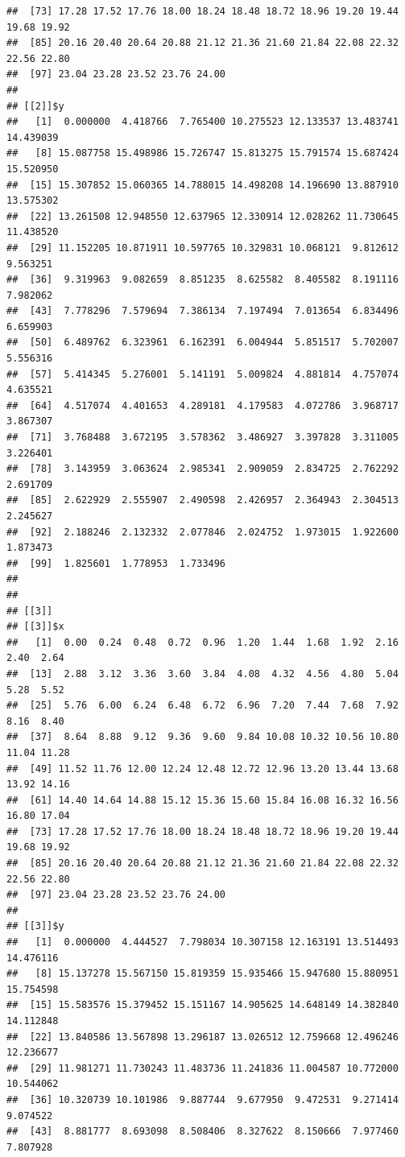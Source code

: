 \documentclass[
  ignorenonframetext,
]{beamer}
\begin{document}
\begin{frame}[fragile]{}
\begin{verbatim}
##  [73] 17.28 17.52 17.76 18.00 18.24 18.48 18.72 18.96 19.20 19.44 19.68 19.92
##  [85] 20.16 20.40 20.64 20.88 21.12 21.36 21.60 21.84 22.08 22.32 22.56 22.80
##  [97] 23.04 23.28 23.52 23.76 24.00
## 
## [[2]]$y
##   [1]  0.000000  4.418766  7.765400 10.275523 12.133537 13.483741 14.439039
##   [8] 15.087758 15.498986 15.726747 15.813275 15.791574 15.687424 15.520950
##  [15] 15.307852 15.060365 14.788015 14.498208 14.196690 13.887910 13.575302
##  [22] 13.261508 12.948550 12.637965 12.330914 12.028262 11.730645 11.438520
##  [29] 11.152205 10.871911 10.597765 10.329831 10.068121  9.812612  9.563251
##  [36]  9.319963  9.082659  8.851235  8.625582  8.405582  8.191116  7.982062
##  [43]  7.778296  7.579694  7.386134  7.197494  7.013654  6.834496  6.659903
##  [50]  6.489762  6.323961  6.162391  6.004944  5.851517  5.702007  5.556316
##  [57]  5.414345  5.276001  5.141191  5.009824  4.881814  4.757074  4.635521
##  [64]  4.517074  4.401653  4.289181  4.179583  4.072786  3.968717  3.867307
##  [71]  3.768488  3.672195  3.578362  3.486927  3.397828  3.311005  3.226401
##  [78]  3.143959  3.063624  2.985341  2.909059  2.834725  2.762292  2.691709
##  [85]  2.622929  2.555907  2.490598  2.426957  2.364943  2.304513  2.245627
##  [92]  2.188246  2.132332  2.077846  2.024752  1.973015  1.922600  1.873473
##  [99]  1.825601  1.778953  1.733496
## 
## 
## [[3]]
## [[3]]$x
##   [1]  0.00  0.24  0.48  0.72  0.96  1.20  1.44  1.68  1.92  2.16  2.40  2.64
##  [13]  2.88  3.12  3.36  3.60  3.84  4.08  4.32  4.56  4.80  5.04  5.28  5.52
##  [25]  5.76  6.00  6.24  6.48  6.72  6.96  7.20  7.44  7.68  7.92  8.16  8.40
##  [37]  8.64  8.88  9.12  9.36  9.60  9.84 10.08 10.32 10.56 10.80 11.04 11.28
##  [49] 11.52 11.76 12.00 12.24 12.48 12.72 12.96 13.20 13.44 13.68 13.92 14.16
##  [61] 14.40 14.64 14.88 15.12 15.36 15.60 15.84 16.08 16.32 16.56 16.80 17.04
##  [73] 17.28 17.52 17.76 18.00 18.24 18.48 18.72 18.96 19.20 19.44 19.68 19.92
##  [85] 20.16 20.40 20.64 20.88 21.12 21.36 21.60 21.84 22.08 22.32 22.56 22.80
##  [97] 23.04 23.28 23.52 23.76 24.00
## 
## [[3]]$y
##   [1]  0.000000  4.444527  7.798034 10.307158 12.163191 13.514493 14.476116
##   [8] 15.137278 15.567150 15.819359 15.935466 15.947680 15.880951 15.754598
##  [15] 15.583576 15.379452 15.151167 14.905625 14.648149 14.382840 14.112848
##  [22] 13.840586 13.567898 13.296187 13.026512 12.759668 12.496246 12.236677
##  [29] 11.981271 11.730243 11.483736 11.241836 11.004587 10.772000 10.544062
##  [36] 10.320739 10.101986  9.887744  9.677950  9.472531  9.271414  9.074522
##  [43]  8.881777  8.693098  8.508406  8.327622  8.150666  7.977460  7.807928

\end{verbatim}
\end{frame}
\end{document}
